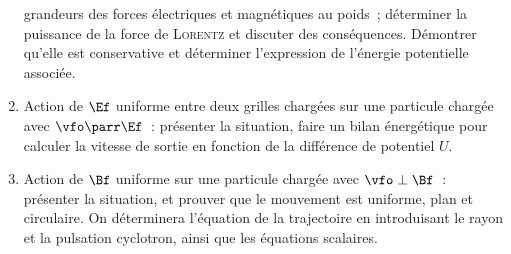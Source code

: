 \documentclass[a4paper, 12pt, final, garamond]{book}
\begin{document}
\begin{enumerate}[label=\sqenumi]
        grandeurs des forces électriques et magnétiques au poids~; déterminer la
        puissance de la force de \textsc{Lorentz} et discuter des conséquences.
        Démontrer qu'elle est conservative et déterminer l'expression de
        l'énergie potentielle associée.
    \item Action de $\Ef$ uniforme entre deux grilles chargées sur une particule
        chargée avec $\vfo\parr\Ef$~: présenter la situation, faire un bilan
        énergétique pour calculer la vitesse de sortie en fonction de la
        différence de potentiel $U$.
    \item Action de $\Bf$ uniforme sur une particule chargée avec
        $\vfo\perp\Bf$~: présenter la situation, et prouver que le mouvement est
        uniforme, plan et circulaire. On déterminera l'équation de la
        trajectoire en introduisant le rayon et la pulsation cyclotron, ainsi
        que les équations scalaires.
\end{enumerate}
\end{document}
